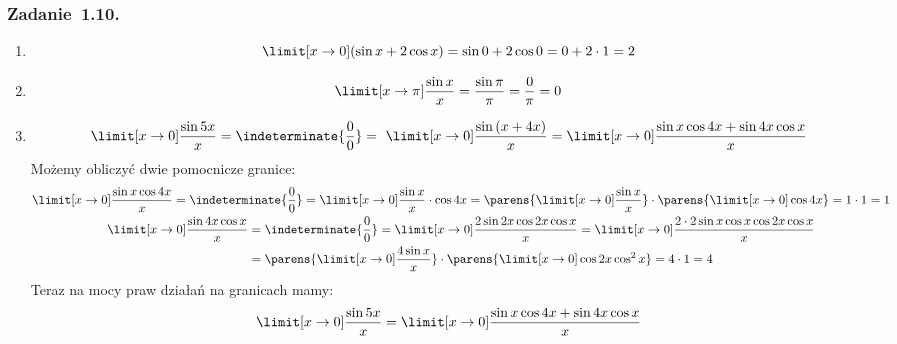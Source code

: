 \subsubsection*{Zadanie~1.10.}
\begin{enumerate}[label={\alph*)}]
    \item
        \begin{equation*}
            \limit[x \to 0] (\sin{x} + 2\cos{x}) = \sin{0} + 2\cos{0} = 0 + 2 \cdot 1 = 2
        \end{equation*}
    \item
        \begin{equation*}
            \limit[x \to \pi] \frac{\sin{x}}{x} = \frac{\sin{\pi}}{\pi} = \frac{0}{\pi} = 0
        \end{equation*}
    \item
        \begin{equation*}
            \limit[x \to 0] \frac{\sin{5x}}{x}
                = \indeterminate{\frac{0}{0}}
                = \limit[x \to 0] \frac{\sin{(x + 4x)}}{x}
                = \limit[x \to 0] \frac{\sin{x}\cos{4x} + \sin{4x}\cos{x}}{x}
        \end{equation*}
        Możemy obliczyć dwie pomocnicze granice:
        \begin{gather*}
            \limit[x \to 0] \frac{\sin{x}\cos{4x}}{x}
                = \indeterminate{\frac{0}{0}}
                = \limit[x \to 0] \frac{\sin{x}}{x} \cdot \cos{4x}
                = \parens{\limit[x \to 0] \frac{\sin{x}}{x}} \cdot \parens{\limit[x \to 0] \cos{4x}}
                = 1 \cdot 1
                = 1\\
            \begin{split}
                \limit[x \to 0] \frac{\sin{4x}\cos{x}}{x}
                    &= \indeterminate{\frac{0}{0}}
                    = \limit[x \to 0] \frac{2\sin{2x}\cos{2x}\cos{x}}{x}
                    = \limit[x \to 0] \frac{2 \cdot 2\sin{x}\cos{x}\cos{2x}\cos{x}}{x}\\
                    &= \parens{\limit[x \to 0] \frac{4\sin{x}}{x}} \cdot \parens{\limit[x \to 0] \cos{2x}\cos^2{x}}
                    = 4 \cdot 1
                    = 4
            \end{split}
        \end{gather*}
        Teraz na mocy praw działań na granicach mamy:
        \begin{equation*}
            \limit[x \to 0] \frac{\sin{5x}}{x}
                = \limit[x \to 0] \frac{\sin{x}\cos{4x} + \sin{4x}\cos{x}}{x}

\end{equation*}
\end{enumerate}
